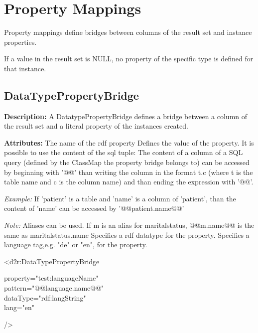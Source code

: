 \section{Property Mappings}
Property mappings define bridges between columns of the result set and instance
properties.

If a value in the result set is NULL, no property of the specific type is defined for
that instance.

\subsection{DataTypePropertyBridge}
\textbf{Description:} \newline
A DatatypePropertyBridge defines a bridge between a column of the result set and a literal property of the instances created.

\textbf{Attributes:} \newline
{}
The name of the rdf property
\EndAttribute
\label{patternLabel}
Defines the value of the property. It is possible to use the content of the sql tuple: The content of a column of a SQL query (defined by the ClassMap the property bridge belongs to) can be accessed by beginning with '@@' than writing the column in the format t.c (where t is the table name and c is the column name) and than ending the expression with '@@'.

\emph{Example:}\newline
If 'patient' is a table and 'name' is a column of 'patient', than the content of 'name' can be accessed by '@@patient.name@@'

\emph{Note:} \newline
Aliases can be used. If m is an alias for maritalstatus, @@m.name@@ is the same as maritalstatus.name
\EndAttribute
{}
Specifies a rdf datatype for the property.
\EndAttribute
{}
Specifies a language tag,e.g. "de" or "en", for the property.
\EndAttribute

\begin{ExampleBox}
	<d2r:DataTypePropertyBridge 
	\begin{indention}{1cm}
		property="test:languageName"\\
		pattern="@@language.name@@"\\ 
		dataType="rdf:langString"\\
		lang="en"
	\end{indention}
	/>
\end{ExampleBox}

